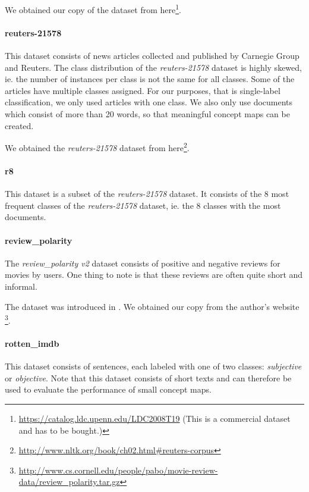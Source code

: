 We obtained our copy of the dataset from here\footnote{\url{https://catalog.ldc.upenn.edu/LDC2008T19} (This is a commercial dataset and has to be bought.)}.

\paragraph{reuters-21578}
This dataset consists of news articles collected and published by Carnegie Group and Reuters.
 The class distribution of the \textit{reuters-21578} dataset is highly skewed, ie. the number of instances per class is not the same for all classes.
 Some of the articles have multiple classes assigned. For our purposes, that is single-label classification, we only used articles with one class.
 We also only use documents which consist of more than 20 words, so that meaningful concept maps can be created.

We obtained the \textit{reuters-21578} dataset from here\footnote{\url{http://www.nltk.org/book/ch02.html\#reuters-corpus}}.

\paragraph{r8}
This dataset is a subset of the \textit{reuters-21578} dataset.
It consists of the 8 most frequent classes of the \textit{reuters-21578} dataset, ie. the 8 classes with the most documents.

\paragraph{review\_polarity}
The \textit{review\_polarity v2} dataset consists of positive and negative reviews for movies by users.
One thing to note is that these reviews are often quite short and informal.

The dataset was introduced in \cite{Pang2004}. We obtained our copy from the author's website \footnote{\url{http://www.cs.cornell.edu/people/pabo/movie-review-data/review\_polarity.tar.gz}}.

\paragraph{rotten\_imdb}
This dataset consists of sentences, each labeled with one of two classes: \textit{subjective} or \textit{objective}.
Note that this dataset consists of short texts and can therefore be used to evaluate the performance of small concept maps.

